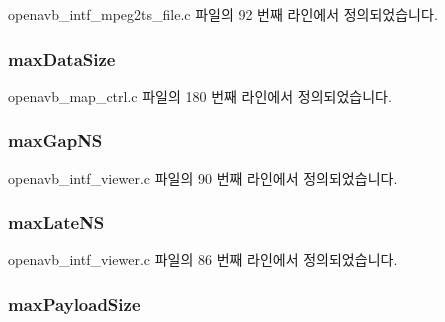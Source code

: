 openavb\+\_\+intf\+\_\+mpeg2ts\+\_\+file.\+c 파일의 92 번째 라인에서 정의되었습니다.

\subsubsection[{\texorpdfstring{max\+Data\+Size}{maxDataSize}}]{ max\+Data\+Size}\hypertarget{structpvt__data__t_a2fe8c370399accee1fc69c230b84564a}{}\label{structpvt__data__t_a2fe8c370399accee1fc69c230b84564a}


openavb\+\_\+map\+\_\+ctrl.\+c 파일의 180 번째 라인에서 정의되었습니다.

\subsubsection[{\texorpdfstring{max\+Gap\+NS}{maxGapNS}}]{ max\+Gap\+NS}\hypertarget{structpvt__data__t_a4e1488cd2f641c9b2f8af7d632c40ff4}{}\label{structpvt__data__t_a4e1488cd2f641c9b2f8af7d632c40ff4}


openavb\+\_\+intf\+\_\+viewer.\+c 파일의 90 번째 라인에서 정의되었습니다.

\subsubsection[{\texorpdfstring{max\+Late\+NS}{maxLateNS}}]{ max\+Late\+NS}\hypertarget{structpvt__data__t_a69c12b55093eb1852d05dfe1b9682ed7}{}\label{structpvt__data__t_a69c12b55093eb1852d05dfe1b9682ed7}


openavb\+\_\+intf\+\_\+viewer.\+c 파일의 86 번째 라인에서 정의되었습니다.

\subsubsection[{\texorpdfstring{max\+Payload\+Size}{maxPayloadSize}}]{ max\+Payload\+Size}\hypertarget{structpvt__data__t_a41116ea77bd2a5f8dc80bbe814719ee1}{}\label{structpvt__data__t_a41116ea77bd2a5f8dc80bbe814719ee1}


